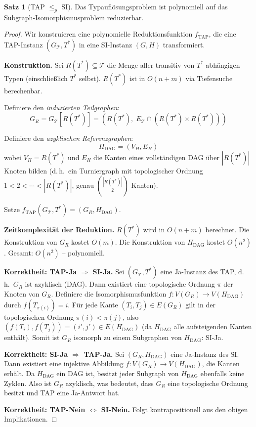 ﻿\documentclass[a4paper,12pt]{article}
\theoremstyle{definition}
\newtheorem{satz}{Satz}
\begin{document}
\begin{satz}[TAP $\leq_p$ SI]
\label{satz:tap-si}
Das Typauflösungsproblem ist polynomiell auf das Subgraph-Isomorphismusproblem reduzierbar.
\end{satz}

\begin{proof}
Wir konstruieren eine polynomielle Reduktionsfunktion $f_{\text{TAP}}$, die eine TAP-Instanz $(G_{\mathcal{T}}, T^*)$ in eine SI-Instanz $(G, H)$ transformiert.

\textbf{Konstruktion.}
Sei $R(T^*) \subseteq \mathcal{T}$ die Menge aller transitiv von $T^*$ abhängigen Typen (einschließlich $T^*$ selbst). $R(T^*)$ ist in $O(n + m)$ via Tiefensuche berechenbar.

Definiere den \emph{induzierten Teilgraphen}:
\[
G_R = G_{\mathcal{T}}[R(T^*)] = (R(T^*),\; E_{\mathcal{T}} \cap (R(T^*) \times R(T^*)))
\]

Definiere den \emph{azyklischen Referenzgraphen}:
\[
H_{\text{DAG}} = (V_H, E_H)
\]
wobei $V_H = R(T^*)$ und $E_H$ die Kanten eines vollständigen DAG über $|R(T^*)|$ Knoten bilden (d.\,h.\ ein Turniergraph mit topologischer Ordnung $1 < 2 < \cdots < |R(T^*)|$, genau $\binom{|R(T^*)|}{2}$ Kanten).

Setze $f_{\text{TAP}}(G_{\mathcal{T}}, T^*) = (G_R, H_{\text{DAG}})$.

\textbf{Zeitkomplexität der Reduktion.}
$R(T^*)$ wird in $O(n + m)$ berechnet. Die Konstruktion von $G_R$ kostet $O(m)$. Die Konstruktion von $H_{\text{DAG}}$ kostet $O(n^2)$. Gesamt: $O(n^2)$ -- polynomiell.

\textbf{Korrektheit: TAP-Ja $\Rightarrow$ SI-Ja.}
Sei $(G_{\mathcal{T}}, T^*)$ eine Ja-Instanz des TAP, d.\,h.\ $G_R$ ist azyklisch (DAG). Dann existiert eine topologische Ordnung $\pi$ der Knoten von $G_R$. Definiere die Isomorphismusfunktion $f: V(G_R) \to V(H_{\text{DAG}})$ durch $f(T_{\pi(i)}) = i$. Für jede Kante $(T_i, T_j) \in E(G_R)$ gilt in der topologischen Ordnung $\pi(i) < \pi(j)$, also $(f(T_i), f(T_j)) = (i', j') \in E(H_{\text{DAG}})$ (da $H_{\text{DAG}}$ alle aufsteigenden Kanten enthält). Somit ist $G_R$ isomorph zu einem Subgraphen von $H_{\text{DAG}}$: SI-Ja.

\textbf{Korrektheit: SI-Ja $\Rightarrow$ TAP-Ja.}
Sei $(G_R, H_{\text{DAG}})$ eine Ja-Instanz des SI. Dann existiert eine injektive Abbildung $f: V(G_R) \to V(H_{\text{DAG}})$, die Kanten erhält. Da $H_{\text{DAG}}$ ein DAG ist, besitzt jeder Subgraph von $H_{\text{DAG}}$ ebenfalls keine Zyklen. Also ist $G_R$ azyklisch, was bedeutet, dass $G_R$ eine topologische Ordnung besitzt und TAP eine Ja-Antwort hat.

\textbf{Korrektheit: TAP-Nein $\Leftrightarrow$ SI-Nein.} Folgt kontrapositionell aus den obigen Implikationen.
\end{proof}
\end{document}
